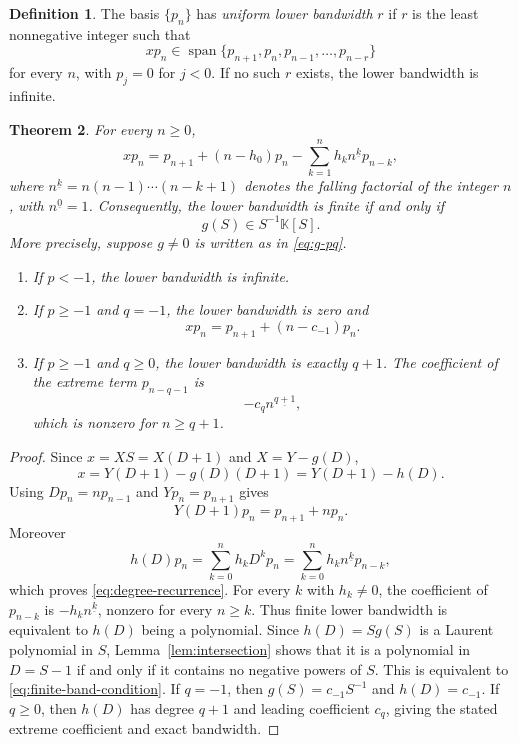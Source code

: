 \documentclass[11pt,reqno]{amsart}
\numberwithin{equation}{section}
\newtheorem{theorem}{Theorem}[section]
\theoremstyle{definition}
\newtheorem{definition}[theorem]{Definition}
\theoremstyle{remark}
\newcommand{\K}{\mathbb K}
\newcommand{\Span}{\operatorname{span}}
\newcommand{\fall}[2]{#1^{\underline{#2}}}
\begin{document}
\begin{definition}\label{def:bandwidth}
The basis $\{p_n\}$ has \emph{uniform lower bandwidth} $r$ if $r$ is the least nonnegative integer such that
\[
 xp_n\in\Span\{p_{n+1},p_n,p_{n-1},\ldots,p_{n-r}\}
\]
for every $n$, with $p_j=0$ for $j<0$.  If no such $r$ exists, the lower bandwidth is infinite.
\end{definition}

\begin{theorem}\label{thm:recurrence}
For every $n\ge0$,
\begin{equation}\label{eq:degree-recurrence}
 xp_n=p_{n+1}+(n-h_0)p_n-
 \sum_{k=1}^{n}h_k\fall{n}{k}p_{n-k},
\end{equation}
where $\fall{n}{k}=n(n-1)\cdots(n-k+1)$ denotes the falling factorial of the integer $n$, with $\fall{n}{0}=1$.
Consequently, the lower bandwidth is finite if and only if
\begin{equation}\label{eq:finite-band-condition}
 g(S)\in S^{-1}\K[S].
\end{equation}
More precisely, suppose $g\ne0$ is written as in \eqref{eq:g-pq}.
\begin{enumerate}[label=\textup{(\alph*)},leftmargin=2.3em]
\item If $p<-1$, the lower bandwidth is infinite.
\item If $p\ge-1$ and $q=-1$, the lower bandwidth is zero and
\[
 xp_n=p_{n+1}+(n-c_{-1})p_n.
\]
\item If $p\ge-1$ and $q\ge0$, the lower bandwidth is exactly $q+1$.  The coefficient of the extreme term $p_{n-q-1}$ is
\[
 -c_q\fall{n}{q+1},
\]
which is nonzero for $n\ge q+1$.
\end{enumerate}
\end{theorem}

\begin{proof}
Since $x=XS=X(D+1)$ and $X=Y-g(D)$,
\[
 x=Y(D+1)-g(D)(D+1)=Y(D+1)-h(D).
\]
Using $Dp_n=np_{n-1}$ and $Yp_n=p_{n+1}$ gives
\[
 Y(D+1)p_n=p_{n+1}+np_n.
\]
Moreover
\[
 h(D)p_n=\sum_{k=0}^{n}h_kD^kp_n
 =\sum_{k=0}^{n}h_k\fall{n}{k}p_{n-k},
\]
which proves \eqref{eq:degree-recurrence}. For every $k$ with $h_k\ne0$, the coefficient of $p_{n-k}$ is $-h_k\fall{n}{k}$, nonzero for every $n\ge k$.  Thus finite lower bandwidth is equivalent to $h(D)$ being a polynomial.  Since $h(D)=Sg(S)$ is a Laurent polynomial in $S$, Lemma~\ref{lem:intersection} shows that it is a polynomial in $D=S-1$ if and only if it contains no negative powers of $S$.  This is equivalent to \eqref{eq:finite-band-condition}.  If $q=-1$, then $g(S)=c_{-1}S^{-1}$ and $h(D)=c_{-1}$.  If $q\ge0$, then $h(D)$ has degree $q+1$ and leading coefficient $c_q$, giving the stated extreme coefficient and exact bandwidth.
\end{proof}
\end{document}
